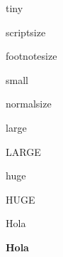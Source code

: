 \documentclass{book}
\begin{document}
{\tiny tiny}

{\scriptsize scriptsize}

{\footnotesize footnotesize}

{\small small}

{\normalsize normalsize}

{\large large}

{\Large LARGE}

{\huge huge}

{\Huge HUGE}

{\Huge Hola}

{\Huge\bf Hola}
\end{document}
